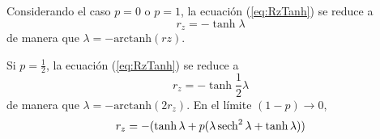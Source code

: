 Considerando el caso $p=0$ o $p=1$, la ecuación (\ref{eq:RzTanh}) se reduce a 
\begin{equation}
r_z=-\tanh{\lambda}
\end{equation}
de manera que $\lambda=-\text{arctanh}(rz)$.

Si $p=\frac{1}{2}$, la ecuación (\ref{eq:RzTanh}) se reduce a
\begin{equation}
r_z=-\tanh\frac{1}{2}\lambda
\end{equation}
de manera que $\lambda=-\text{arctanh}(2r_{z})$.
En el límite $(1-p)\rightarrow 0$,
\begin{equation}
  r_{z}=-(\tanh{\lambda}+p(\lambda\sech^{2}{\lambda}+\tanh{\lambda}))
\end{equation}
\newpage